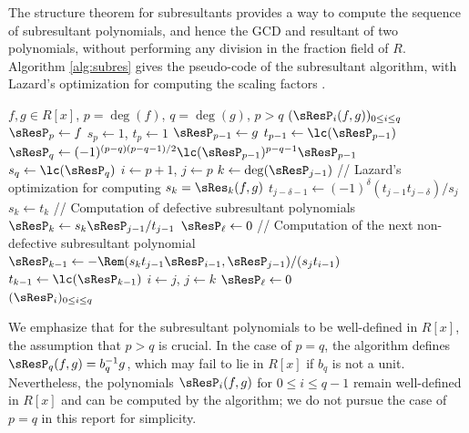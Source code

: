The structure theorem for subresultants provides a way to compute the sequence of subresultant polynomials, and hence the GCD and resultant of two polynomials, without performing any division in the fraction field of $R$. Algorithm \ref{alg:subres} gives the pseudo-code of the subresultant algorithm, with Lazard's optimization for computing the scaling factors \cite{ducos2000optimizations}.

\begin{algorithm}
    \caption{\textsf{SubresultantPolynomials}}\label{alg:subres}
    \begin{algorithmic}[1]
        \Require $f,g\in R[x]$, $p=\deg(f)$, $q=\deg(g)$, $p>q$
        \Ensure $(\sResP_i(f,g))_{0\leq i\leq q}$
        \State $\sResP_{p} \gets f$
        \State $s_p \gets 1$, $t_p \gets 1$
        \State $\sResP_{p-1} \gets g$
        \State $t_{p-1} \gets \lc(\sResP_{p-1})$
        \State $\sResP_{q} \gets (-1)^{(p-q)(p-q-1)/2} \lc(\sResP_{p-1})^{p-q-1}\sResP_{p-1}$
        \State $s_q \gets \lc(\sResP_{q})$
        \State $i \gets p+1$, $j \gets p$
        \State $k \gets \deg(\sResP_{j-1})$
        \State // Lazard's optimization for computing $s_{k}=\sRes_{k}(f,g)$
        \State $t_{j-\delta-1} \gets (-1)^{\delta}(t_{j-1}t_{j-\delta})/s_j$
        \EndFor
        \State $s_{k} \gets t_{k}$
        \State // Computation of defective subresultant polynomials
        \State $\sResP_{k} \gets s_k \sResP_{j-1}/t_{j-1}$
        \State $\sResP_{\ell} \gets 0$
        \EndFor
        \State // Computation of the next non-defective subresultant polynomial
        \State $\sResP_{k-1} \gets -\Rem(s_{k}t_{j-1}\sResP_{i-1},\sResP_{j-1})/(s_j t_{i-1})$
        \State $t_{k-1} \gets \lc(\sResP_{k-1})$
        \State $i \gets j$, $j \gets k$
        \EndWhile
        \State $\sResP_{\ell} \gets 0$
        \EndFor
        \\
        \Return $(\sResP_i)_{0\leq i\leq q}$
    \end{algorithmic}
\end{algorithm}

We emphasize that for the subresultant polynomials to be well-defined in $R[x]$, the assumption that $p>q$ is crucial. In the case of $p=q$, the algorithm defines $\sResP_{q}(f,g)=b_q^{-1} g$, which may fail to lie in $R[x]$ if $b_q$ is not a unit. Nevertheless, the polynomials $\sResP_i(f,g)$ for $0\leq i\leq q-1$ remain well-defined in $R[x]$ and can be computed by the algorithm; we do not pursue the case of $p=q$ in this report for simplicity.

